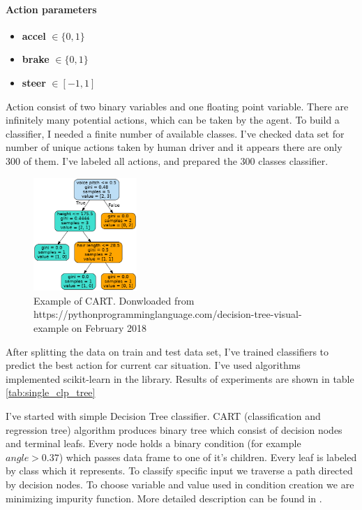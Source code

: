 \documentclass[declaration,shortabstract,english,inz]{iithesis}
\begin{document}
\paragraph{Action parameters}
\begin{itemize}
    \item \textbf{accel} $\in \{0,1\}$
    \item \textbf{brake} $\in \{0,1\}$ 
    \item \textbf{steer} $\in [-1,1]$
\end{itemize}

Action consist of two binary variables and one floating point variable. There are infinitely many potential actions, which can be taken by the agent. To build a classifier, I needed a finite number of available classes. I've checked data set for number of unique actions taken by human driver and it appears there are only 300 of them. I've labeled all actions, and prepared the 300 classes classifier.

\begin{figure}
    \includegraphics[width=0.35\textwidth]{img/tree.png}
    \caption{Example of CART. Donwloaded from https://pythonprogramminglanguage.com/decision-tree-visual-example on February 2018 \cite{scrc_manual}}
    \label{fig:CART}
\end{figure}

After splitting the data on train and test data set, I've trained classifiers to predict the best action for current car situation.
I've used algorithms implemented scikit-learn in the \cite{scikit_learn} library.
Results of experiments are shown in table \ref{tab:single_clp_tree}

I've started with simple Decision Tree classifier.
CART (classification and regression tree) algorithm produces binary tree which consist of decision nodes and terminal leafs.
Every node holds a binary condition (for example $\textit{angle} > 0.37$) which passes data frame to one of it's children.
Every leaf is labeled by class which it represents.
To classify specific input we traverse a path directed by decision nodes.
To choose variable and value used in condition creation we are minimizing impurity function.
More detailed description can be found in \cite{Introduction_ML}.
\end{document}
